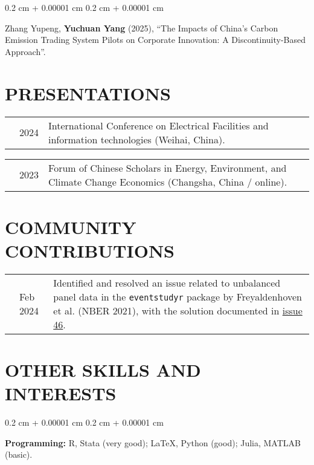 \documentclass[10pt, letterpaper]{article}
\newenvironment{onecolentry}{
    \begin{adjustwidth}{
        0.2 cm + 0.00001 cm
    }{
        0.2 cm + 0.00001 cm
    }
}{
    \end{adjustwidth}
} %
\newenvironment{paper}{\vspace{.2cm}\begin{samepage}\begin{onecolentry}}{\end{onecolentry}\end{samepage}\vspace{0.2cm}}
\begin{document}
\begin{paper}
	Zhang Yupeng, \textbf{Yuchuan Yang} (2025), ``The Impacts of China’s Carbon Emission Trading System Pilots on Corporate Innovation: A Discontinuity-Based Approach''.
\end{paper}



\section{PRESENTATIONS}

\vspace{.2cm}
\begin{tabularx}{\textwidth}{@{}p{.2cm} @{}p{1cm} X@{}}
& 2024 & International Conference on Electrical Facilities and information technologies (Weihai, China).
\end{tabularx}

\vspace{.2cm}

\begin{tabularx}{\textwidth}{@{}p{.2cm} @{}p{1cm} X@{}}
& 2023 & Forum of Chinese Scholars in Energy, Environment, and Climate Change Economics (Changsha, China / online).
\end{tabularx}

\vspace{.2cm}



\section{COMMUNITY CONTRIBUTIONS}

\vspace{.2cm}
\begin{tabularx}{\textwidth}{@{}p{.2cm} @{}p{1.5cm} X@{}}
	& Feb 2024 & Identified and resolved an issue related to unbalanced panel data in the \texttt{eventstudyr} package by Freyaldenhoven et al. (NBER 2021), with the solution documented in \href{https://github.com/ISSUE46}{issue 46}.
\end{tabularx}

\vspace{.2cm}


\section{OTHER SKILLS AND INTERESTS}

\begin{paper}
	\textbf{Programming:} R, Stata (very good); \LaTeX, Python (good); Julia, MATLAB (basic).
\end{paper}
\end{document}
